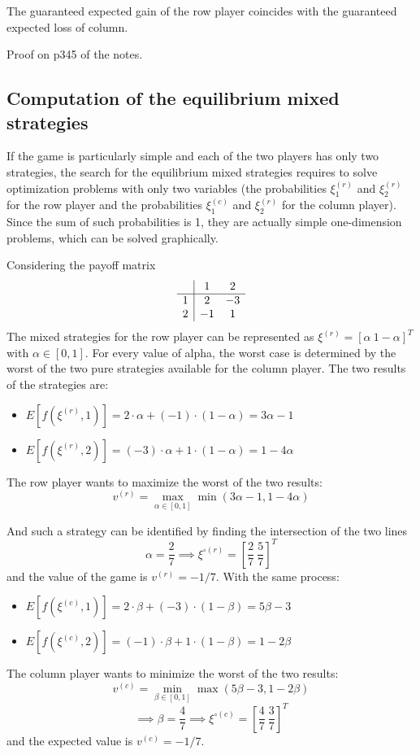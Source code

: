 The guaranteed expected gain of the row player coincides with the guaranteed expected loss of column.

Proof on p345 of the notes.

\subsection{Computation of the equilibrium mixed strategies}

If the game is particularly simple and each of the two players has only two strategies, the search for the equilibrium mixed strategies requires to solve optimization problems with only two variables (the probabilities $\xi^{(r)}_1$ and $\xi^{(r)}_2$ for the row player and the probabilities $\xi^{(c)}_1$ and $\xi^{(r)}_2$ for the column player). Since the sum of such probabilities is 1, they are actually simple one-dimension problems, which can be solved graphically.

Considering the payoff matrix
$$ 
\begin{array}{c | c c}
	& 1 & 2 \\
	\hline
	1 & 2 & -3 \\
	2 & -1 & 1 
\end{array}
$$
The mixed strategies for the row player can be represented as $\xi^{(r)} = \left[\alpha \ 1 - \alpha\right]^T$ with $\alpha \in [0,1]$. For every value of alpha, the worst case is determined by the worst of the two pure strategies available for the column player. The two results of the strategies are: 
\begin{itemize}
	\item $E\left[f(\xi^{(r)}, 1)\right] = 2 \cdot \alpha + (-1) \cdot (1 - \alpha) = 3 \alpha - 1$
	
	\item $E\left[f(\xi^{(r)}, 2)\right] = (-3) \cdot \alpha + 1 \cdot (1 - \alpha) = 1 - 4 \alpha$
\end{itemize}

The row player wants to maximize the worst of the two results:
$$ v^{(r)} = \max_{\alpha \in [0,1]} \min (3 \alpha - 1, 1 - 4 \alpha) $$

And such a strategy can be identified by finding the intersection of the two lines
$$ \alpha = \frac{2}{7} \implies \xi^{\circ (r)} = \left[\frac{2}{7} \ \frac{5}{7}\right]^T$$
and the value of the game is $v^{(r)} = -1/7$. With the same process: 
\begin{itemize}
	\item $E\left[f(\xi^{(c)}, 1)\right] = 2 \cdot \beta + (-3) \cdot (1 - \beta) = 5 \beta - 3$
	
	\item $E\left[f(\xi^{(c)}, 2)\right] = (-1) \cdot \beta + 1 \cdot (1 - \beta) = 1 - 2 \beta$
\end{itemize}
The column player wants to minimize the worst of the two results:
$$ v^{(c)} = \min_{\beta \in [0,1]} \max (5 \beta - 3, 1 - 2\beta)$$
$$ \implies \beta = \frac{4}{7} \implies \xi^{\circ (c)} = \left[\frac{4}{7} \ \frac{3}{7}\right]^T $$
and the expected value is $v^{(c)} = - 1/7$.

